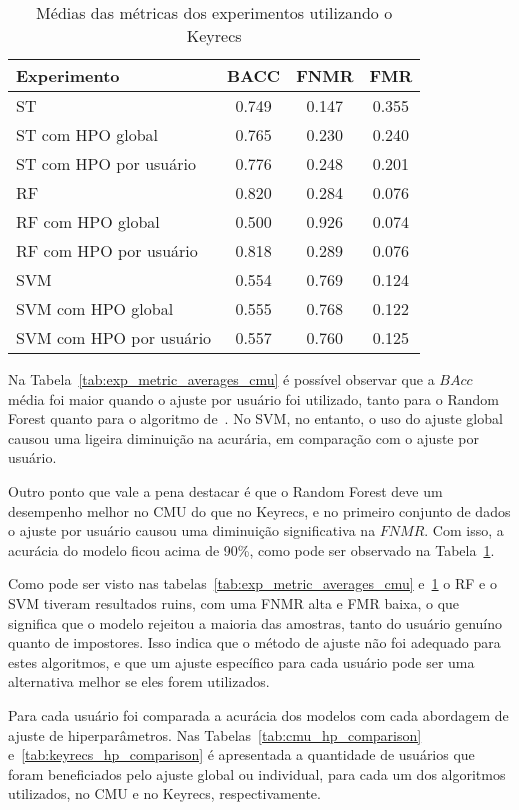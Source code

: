 \begin{table}[htbp]
\centering
\caption{Médias das métricas dos experimentos utilizando o Keyrecs}
\label{tab:exp_metric_averages_keyrecs}
\begin{tabular}{|l|c|c|c|}
\hline
\textbf{Experimento} & \textbf{BACC} & \textbf{FNMR} & \textbf{FMR} \\
\hline
ST & 0.749 & 0.147 & 0.355 \\
\hline
ST com HPO global & 0.765 & 0.230 & 0.240 \\
\hline
ST com HPO por usuário & 0.776 & 0.248 & 0.201 \\
\hline
RF & 0.820 & 0.284 & 0.076 \\
\hline
RF com HPO global & 0.500 & 0.926 & 0.074 \\
\hline
RF com HPO por usuário & 0.818 & 0.289 & 0.076 \\
\hline
SVM & 0.554 & 0.769 & 0.124 \\
\hline
SVM com HPO global & 0.555 & 0.768 & 0.122 \\
\hline
SVM com HPO por usuário & 0.557 & 0.760 & 0.125 \\
\hline
\end{tabular}
\end{table}

Na Tabela~\ref{tab:exp_metric_averages_cmu} é possível observar que a $BAcc$ média foi maior quando o ajuste por usuário foi utilizado, tanto para o Random Forest quanto para o algoritmo de~. No SVM, no entanto, o uso do ajuste global causou uma ligeira diminuição na acurária, em comparação com o ajuste por usuário.

Outro ponto que vale a pena destacar é que o Random Forest deve um desempenho melhor no CMU do que no Keyrecs, e no primeiro conjunto de dados o ajuste por usuário causou uma diminuição significativa na $FNMR$. Com isso, a acurácia do modelo ficou acima de 90\%, como pode ser observado na Tabela~\ref{tab:exp_metric_averages_keyrecs}.

Como pode ser visto nas tabelas~\ref{tab:exp_metric_averages_cmu} e~\ref{tab:exp_metric_averages_keyrecs} o RF e o SVM tiveram resultados ruins, com uma FNMR alta e FMR baixa, o que significa que o modelo rejeitou a maioria das amostras, tanto do usuário genuíno quanto de impostores. Isso indica que o método de ajuste não foi adequado para estes algoritmos, e que um ajuste específico para cada usuário pode ser uma alternativa melhor se eles forem utilizados.

Para cada usuário foi comparada a acurácia dos modelos com cada abordagem de ajuste de hiperparâmetros. Nas Tabelas~\ref{tab:cmu_hp_comparison} e~\ref{tab:keyrecs_hp_comparison} é apresentada a quantidade de usuários que foram beneficiados pelo ajuste global ou individual, para cada um dos algoritmos utilizados, no CMU e no Keyrecs, respectivamente. 

